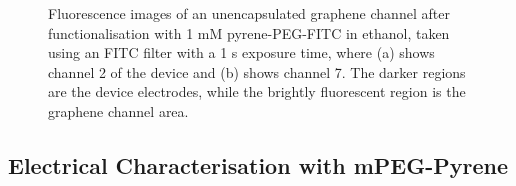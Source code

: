 \documentclass[
  a4paper,
]{scrbook}
\begin{document}
\begin{figure}
\begin{minipage}[t]{0.47\linewidth}
{{}

}

\subcaption{\label{fig-FITC-EtOH-ch7}}
\end{minipage}%

\caption{\label{fig-FITC-EtOH}Fluorescence images of an unencapsulated
graphene channel after functionalisation with 1 mM pyrene-PEG-FITC in
ethanol, taken using an FITC filter with a 1 s exposure time, where (a)
shows channel 2 of the device and (b) shows channel 7. The darker
regions are the device electrodes, while the brightly fluorescent region
is the graphene channel area.}

\end{figure}

\hypertarget{electrical-characterisation-with-mpeg-pyrene}{%
\subsection{Electrical Characterisation with
mPEG-Pyrene}\label{electrical-characterisation-with-mpeg-pyrene}}
\end{document}
